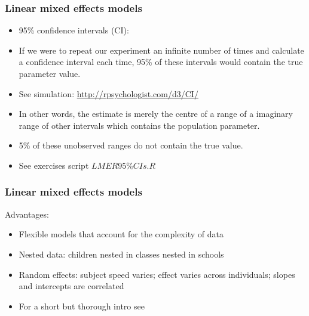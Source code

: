 \begin{frame}
	\frametitle{Linear mixed effects models}
	\begin{itemize}
		\item 95\% confidence intervals (CI): 
		\item[] If we were to repeat our experiment an infinite number of times and calculate a confidence interval each time, 95\% of these intervals would contain the true parameter value.
		\item See simulation: \url{http://rpsychologist.com/d3/CI/}
		\item In other words, the estimate is merely the centre of a range of a imaginary range of other intervals which contains the population parameter.
		\item 5\% of these unobserved ranges do not contain the true value. 
		\item See exercises script $LMER95\%CIs.R$
	\end{itemize}

\end{frame}


\begin{frame}
	\frametitle{Linear mixed effects models}
	
	Advantages:
	\begin{itemize}
		\item Flexible models that account for the complexity of data
		\item Nested data: children nested in classes nested in schools %
		\item Random effects: subject speed varies; effect varies across individuals; slopes and intercepts are correlated
		\item For a short but thorough intro see 
		 
	\end{itemize}
	
\end{frame}		



